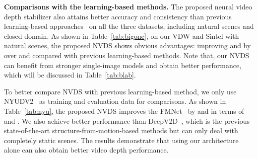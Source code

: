 \documentclass[10pt,twocolumn,letterpaper]{article}
\def\fw{neural video depth stabilizer}
\def\sx{NVDS}
\def\data{VDW}
\def\sota{state-of-the-art}
\def\reftab{Table}
\begin{document}
\noindent \textbf{Comparisons with the learning-based methods.} The proposed \fw{} also attains better accuracy and consistency than previous learning-based approaches~\cite{ST-CLSTM,fmnet,MM21,wsvd} on all the three datasets, including natural scenes and closed domain. As shown in \reftab{}~\ref{tab:bigone}, on our \data{} and Sintel with natural scenes, the proposed \sx{} shows obvious advantages: improving  and  by over  and  compared with previous learning-based methods. Note that, our \sx{} can benefit from stronger single-image models and obtain better performance, which will be discussed in \reftab{}~\ref{tab:blab}.  

To better compare \sx{} with previous learning-based method, we only use NYUDV2~\cite{nyu} as training and evaluation data for comparisons. As shown in \reftab{}~\ref{tab:nyu}, the proposed \sx{} improves the FMNet~\cite{fmnet} by  and  in terms of  and  . We also achieve better performance than DeepV2D~\cite{deepv2d}, which is the previous \sota{} structure-from-motion-based methods but can only deal with completely static scenes. The results demonstrate that using our architecture alone can also obtain better video depth performance. 
\end{document}
